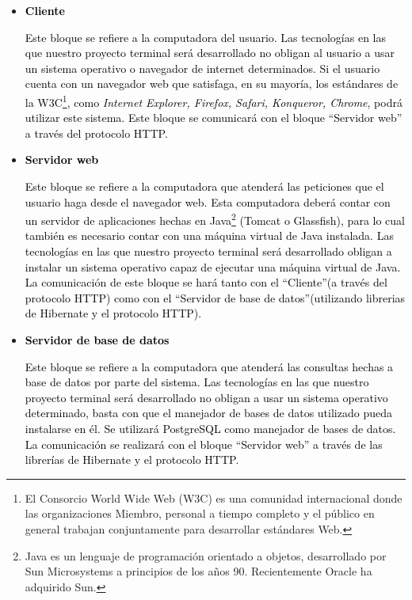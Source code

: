 \documentclass[11pt,letterpaper,titlepage]{article}
\begin{document}
\begin{itemize}
  \item \textcolor{black}{\textbf{Cliente}}

\textcolor{black}{Este bloque se refiere a la computadora del usuario. Las tecnolog\'ias en las que nuestro proyecto terminal ser\'a desarrollado no obligan al usuario a usar un sistema operativo o navegador de internet determinados. Si el usuario cuenta con un navegador web que satisfaga, en su mayor\'ia, los est\'andares de la W3C\footnote{El Consorcio World Wide Web (W3C) es una comunidad internacional donde las organizaciones Miembro, personal a tiempo completo y el p\'ublico en general trabajan conjuntamente para desarrollar est\'andares Web.}\cite{w3c}, como \textit{Internet Explorer, Firefox, Safari, Konqueror, Chrome}, podr\'a utilizar este sistema. Este bloque se comunicar\'a con el bloque ``Servidor web'' a trav\'es del protocolo HTTP.}

  \item \textcolor{black}{\textbf{Servidor web}}

\textcolor{black}{Este bloque se refiere a la computadora que atender\'a las peticiones que el usuario haga desde el navegador web. Esta computadora deber\'a contar con un servidor de aplicaciones hechas en Java\footnote{Java es un lenguaje de programaci\'on orientado a objetos, desarrollado por Sun Microsystems a principios de los a\~nos 90. Recientemente Oracle ha adquirido Sun.}\cite{oracle}  (Tomcat o Glassfish), para lo cual tambi\'en es necesario contar con una m\'aquina virtual de Java instalada. Las tecnolog\'ias en las que nuestro proyecto terminal ser\'a desarrollado obligan a instalar un sistema operativo capaz de ejecutar una m\'aquina virtual de Java.  La comunicaci\'on de este bloque se har\'a tanto con el ``Cliente''(a trav\'es del protocolo HTTP) como con el ``Servidor de base de datos''(utilizando librerias de Hibernate y el protocolo HTTP).}

  \item \textcolor{black}{\textbf{Servidor de base de datos}}

\textcolor{black}{Este bloque se refiere a la computadora que atender\'a las consultas hechas a base de datos por parte del sistema. Las tecnolog\'ias en las que nuestro proyecto terminal ser\'a desarrollado no obligan a usar un sistema operativo determinado, basta con que el manejador de bases de datos utilizado pueda instalarse en \'el. Se utilizar\'a PostgreSQL como manejador de bases de datos. La comunicaci\'on se realizar\'a con el bloque ``Servidor web'' a trav\'es de las librer\'ias de Hibernate y el protocolo HTTP. }

\end{itemize}
\end{document}
